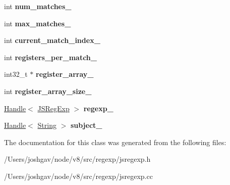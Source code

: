 \begin{DoxyCompactItemize}
\item 
int {\bfseries num\+\_\+matches\+\_\+}\hypertarget{classv8_1_1internal_1_1_reg_exp_impl_1_1_global_cache_a845ce6a7dd19df54e22dbf5224126133}{}\label{classv8_1_1internal_1_1_reg_exp_impl_1_1_global_cache_a845ce6a7dd19df54e22dbf5224126133}

\item 
int {\bfseries max\+\_\+matches\+\_\+}\hypertarget{classv8_1_1internal_1_1_reg_exp_impl_1_1_global_cache_ad08a06c89535b7f97dfd6c2c22fb5c07}{}\label{classv8_1_1internal_1_1_reg_exp_impl_1_1_global_cache_ad08a06c89535b7f97dfd6c2c22fb5c07}

\item 
int {\bfseries current\+\_\+match\+\_\+index\+\_\+}\hypertarget{classv8_1_1internal_1_1_reg_exp_impl_1_1_global_cache_a0e2fa493f282826c2fcc51237178241b}{}\label{classv8_1_1internal_1_1_reg_exp_impl_1_1_global_cache_a0e2fa493f282826c2fcc51237178241b}

\item 
int {\bfseries registers\+\_\+per\+\_\+match\+\_\+}\hypertarget{classv8_1_1internal_1_1_reg_exp_impl_1_1_global_cache_aca0748e6d4886869d475dfa3cbce18c1}{}\label{classv8_1_1internal_1_1_reg_exp_impl_1_1_global_cache_aca0748e6d4886869d475dfa3cbce18c1}

\item 
int32\+\_\+t $\ast$ {\bfseries register\+\_\+array\+\_\+}\hypertarget{classv8_1_1internal_1_1_reg_exp_impl_1_1_global_cache_a627bcca04d2441039e0d831e18d4cdd6}{}\label{classv8_1_1internal_1_1_reg_exp_impl_1_1_global_cache_a627bcca04d2441039e0d831e18d4cdd6}

\item 
int {\bfseries register\+\_\+array\+\_\+size\+\_\+}\hypertarget{classv8_1_1internal_1_1_reg_exp_impl_1_1_global_cache_a16bddf515744b33dcb6a1a81728e72da}{}\label{classv8_1_1internal_1_1_reg_exp_impl_1_1_global_cache_a16bddf515744b33dcb6a1a81728e72da}

\item 
\hyperlink{classv8_1_1internal_1_1_handle}{Handle}$<$ \hyperlink{classv8_1_1internal_1_1_j_s_reg_exp}{J\+S\+Reg\+Exp} $>$ {\bfseries regexp\+\_\+}\hypertarget{classv8_1_1internal_1_1_reg_exp_impl_1_1_global_cache_a804e6d7926fd485247ecdc385df76aee}{}\label{classv8_1_1internal_1_1_reg_exp_impl_1_1_global_cache_a804e6d7926fd485247ecdc385df76aee}

\item 
\hyperlink{classv8_1_1internal_1_1_handle}{Handle}$<$ \hyperlink{classv8_1_1internal_1_1_string}{String} $>$ {\bfseries subject\+\_\+}\hypertarget{classv8_1_1internal_1_1_reg_exp_impl_1_1_global_cache_a5591e75f1e515daaed8cb747dbd57bd8}{}\label{classv8_1_1internal_1_1_reg_exp_impl_1_1_global_cache_a5591e75f1e515daaed8cb747dbd57bd8}

\end{DoxyCompactItemize}


The documentation for this class was generated from the following files\+:\begin{DoxyCompactItemize}
\item 
/\+Users/joshgav/node/v8/src/regexp/jsregexp.\+h\item 
/\+Users/joshgav/node/v8/src/regexp/jsregexp.\+cc\end{DoxyCompactItemize}
